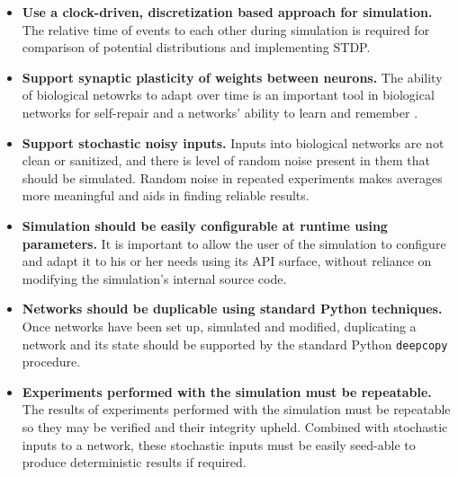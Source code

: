 \begin{itemize}
    \item \textbf{Use a clock-driven, discretization based approach for simulation.} The relative time of
    events to each other during simulation is required for comparison of
    potential distributions and implementing STDP.

    \item \textbf{Support synaptic plasticity of weights between neurons.} The
    ability of biological netowrks to adapt over time is an important tool in
    biological networks for self-repair \autocite{trappenberg_fundamentals_2009} and a networks' ability to learn and
    remember \autocite{eichenbaum_cognitive_2011}. 
      
      \item \textbf{Support stochastic noisy inputs.} Inputs into biological
      networks are not clean or sanitized, and there is level of random noise
      present in them that should be simulated. Random noise in repeated
      experiments makes averages more meaningful and aids in finding reliable results.

    \item \textbf{Simulation should be easily configurable at runtime using
    parameters.} It is important to allow the user of the simulation to
    configure and adapt it to his or her needs using its API surface, without
    reliance on modifying the simulation's internal source code.

    \item \textbf{Networks should be duplicable using standard Python
    techniques.} Once networks have been set up, simulated and modified,
    duplicating a network and its state should be supported by the standard
    Python \texttt{deepcopy} procedure.

    \item \textbf{Experiments performed with the simulation must be repeatable.}
          The results of experiments performed with the simulation must be
          repeatable so they may be verified and their integrity upheld.
          Combined with stochastic inputs to a network, these stochastic inputs
          must be easily seed-able to produce deterministic results if required. 




\end{itemize}